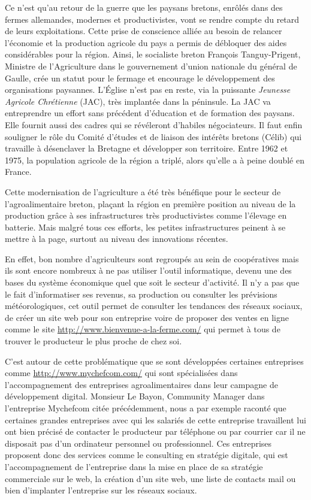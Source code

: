 \documentclass[a4paper,12pt]{report}
\begin{document}
			Ce n’est qu’au retour de la guerre que les paysans bretons, enrôlés dans des fermes allemandes, modernes et productivistes, vont se rendre compte du retard de leurs exploitations. Cette prise de conscience alliée au besoin de relancer l’économie et la production agricole du pays a permis de débloquer des aides considérables pour la région. Ainsi, le socialiste breton François Tanguy-Prigent, Ministre de l'Agriculture dans le gouvernement d'union nationale du général de Gaulle, crée un statut pour le fermage et encourage le développement des organisations paysannes. L'Église n'est pas en reste, via la puissante \textit{Jeunesse Agricole Chrétienne} (JAC), très implantée dans la péninsule. La JAC va entreprendre un effort sans précédent d'éducation et de formation des paysans. Elle fournit aussi des cadres qui se révéleront d'habiles négociateurs. Il faut enfin souligner le rôle du Comité d'études et de liaison des intérêts bretons (Célib) qui travaille à désenclaver la Bretagne et développer son territoire\cite{ModernisationAgricultureBretonne}. Entre 1962 et 1975, la population agricole de la région a triplé, alors qu’elle a à peine doublé en France.
			
			Cette modernisation de l’agriculture a été très bénéfique pour le secteur de l’agroalimentaire breton, plaçant la région en première position au niveau de la production grâce à ses infrastructures très productivistes comme l’élevage en batterie. Mais malgré tous ces efforts, les petites infrastructures peinent à se mettre à la page, surtout au niveau des innovations récentes. 
			
			En effet, bon nombre d’agriculteurs sont regroupés au sein de coopératives mais ils sont encore nombreux à ne pas utiliser l’outil informatique, devenu une des bases du système économique quel que soit le secteur d’activité\cite{FAIPeuInteresses,AdoptionTICAgricole}. Il n’y a pas que le fait d’informatiser ses revenus, sa production ou consulter les prévisions météorologiques, cet outil permet de consulter les tendances des réseaux sociaux, de créer un site web pour son entreprise voire de proposer des ventes en ligne comme le site \url{http://www.bienvenue-a-la-ferme.com/} qui permet à tous de trouver le producteur le plus proche de chez soi.
			
			C’est autour de cette problématique que se sont développées certaines entreprises comme \url{http://www.mychefcom.com/} qui sont spécialisées dans l’accompagnement des entreprises agroalimentaires dans leur campagne de développement digital. Monsieur Le Bayon, Community Manager dans l’entreprise Mychefcom citée précédemment, nous a par exemple raconté que certaines grandes entreprises avec qui les salariés de cette entreprise travaillent lui ont bien précisé de contacter le producteur par téléphone ou par courrier car il ne disposait pas d’un ordinateur personnel ou professionnel. Ces entreprises proposent donc des services comme le consulting en stratégie digitale, qui est l’accompagnement de l’entreprise dans la mise en place de sa stratégie commerciale sur le web, la création d’un site web, une liste de contacts mail ou bien d’implanter l’entreprise sur les réseaux sociaux.
			
\end{document}
